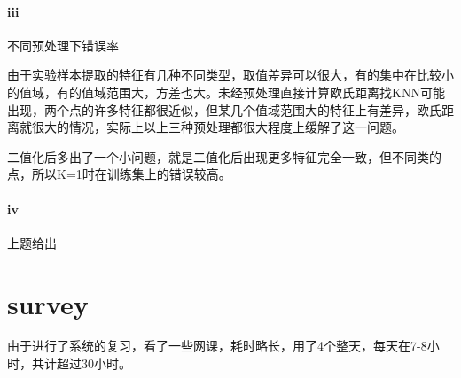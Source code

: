 \documentclass[hyperref,UTF8]{ctexart}
\begin{document}
\paragraph{iii}不同预处理下错误率\\
\begin{table}[!htbp]
  \centering
\caption{不同预处理下错误率KNN}
\label{tb:lda_knn}
\end{table}
\par 由于实验样本提取的特征有几种不同类型，取值差异可以很大，有的集中在比较小的值域，有的值域范围大，方差也大。未经预处理直接计算欧氏距离找KNN可能出现，两个点的许多特征都很近似，但某几个值域范围大的特征上有差异，欧氏距离就很大的情况，实际上以上三种预处理都很大程度上缓解了这一问题。
\par 二值化后多出了一个小问题，就是二值化后出现更多特征完全一致，但不同类的点，所以K=1时在训练集上的错误较高。


\paragraph{iv}上题给出

\section*{survey}
\par 由于进行了系统的复习，看了一些网课，耗时略长，用了4个整天，每天在7-8小时，共计超过30小时。




\end{document}

